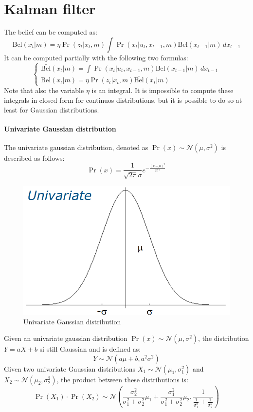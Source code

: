 \section{Kalman filter}

The belief can be computed as: 
\[\text{Bel}(x_t|m)=\eta\Pr(z_t|x_t,m)\int\Pr(x_t|u_t,x_{t-1},m)\text{Bel}(x_{t-1}|m)\,dx_{t-1}\]
It can be computed partially with the following two formulas: 
\[\begin{cases}
    \bar{\text{Bel}}(x_t|m)=\int\Pr(x_t|u_t,x_{t-1},m)\text{Bel}(x_{t-1}|m)\,dx_{t-1} \\
    \text{Bel}(x_t|m)=\eta\Pr(z_t|x_t,m)\bar{\text{Bel}}(x_t|m)
\end{cases}\]
Note that also the variable $\eta$ is an integral. 
It is impossible to compute these integrals in closed form for continuos distributions, but it is possible to do so at least for Gaussian distributions. 

\paragraph*{Univariate Gaussian distribution}
The univariate gaussian distribution, denoted as $\Pr(x)\sim \mathcal{N}(\mu,\sigma^2)$ is described as follows: 
\[\Pr(x)=\dfrac{1}{\sqrt{2\pi}\sigma}e^{-\frac{(x-\mu)^2}{2\sigma^2}}\]
\begin{figure}[H]
    \centering
    \includegraphics[width=0.6\linewidth]{images/ugd.png}
    \caption{Univariate Gaussian distribution}
\end{figure}
Given an univariate gaussian distribution $\Pr(x)\sim \mathcal{N}(\mu,\sigma^2)$, the distribution $Y=aX+b$ si still Gaussian and is defined as: 
\[Y\sim \mathcal{N}(a\mu+b,a^2\sigma^2)\]
Given two univariate Gaussian distributions $X_1\sim\mathcal{N}(\mu_1,\sigma_1^2)$ and $X_2\sim\mathcal{N}(\mu_2,\sigma_2^2)$, the product between these distributions is: 
\[\Pr(X_1)\cdot\Pr(X_2)\sim\mathcal{N}\left(\dfrac{\sigma_2^2}{\sigma_1^2+\sigma_2^2}\mu_1+\dfrac{\sigma_1^2}{\sigma_1^2+\sigma_2^2}\mu_2,\dfrac{1}{\frac{1}{\sigma_1^2}+\frac{1}{\sigma_2^2}}\right)\]

